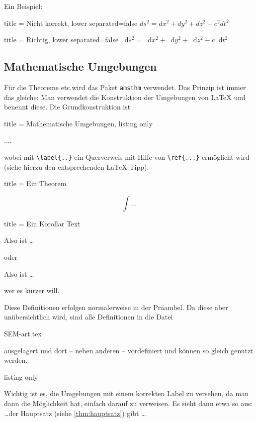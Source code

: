 Ein Beispiel:
\begin{tcblisting}{title = Nicht korrekt, lower separated=false}
$ ds^2=dx^2+dy^2+dz^2-c^2dt^2 $
\end{tcblisting}
\vs 
\begin{tcblisting}{title = Richtig, lower separated=false}
\renewcommand*{\d}[1]{\mathop{}\!\mathrm{d}{#1}}
%
$ \d{s}^{2} = \d{x}^{2} + \d{y}^{2} + \d{z}^{2} - c\d{t}^{2} $
\end{tcblisting}

\subsection{Mathematische Umgebungen}
Für die Theoreme etc.\@ wird das Paket \texttt{amsthm} \cite{amsthm} verwendet.
Das Prinzip ist immer das gleiche: Man verwendet die Konstruktion der Umgebungen von \LaTeX{}{} und benennt diese.
Die Grundkonstruktion ist 
%
\begin{tcblisting}{title = Mathematische Umgebungen, listing only}
\begin{name}\label{key:kuerzel}
 ....
\end{name}
\end{tcblisting}
%
wobei mit \verb!\label{..}! ein Querverweis mit Hilfe von \verb|\ref{...}| ermöglicht wird (siehe hierzu den entsprechenden \LaTeX{}-Tipp).
%
\begin{tcblisting}{title = Ein Theorem}
\begin{theorem}
\[
 \int \ldots
\]
\end{theorem}
\end{tcblisting}
%
\begin{tcblisting}{title = Ein Korollar}
Text
%
\begin{corollary}
  Also ist \ldots
\end{corollary}
%
oder
%
\begin{cor}
  Also ist \ldots
\end{cor}
%
wer es kürzer will.
\end{tcblisting}
%
Diese Definitionen erfolgen normalerweise in der Präambel.
Da diese aber unübersichtlich wird, sind alle Definitionen in die Datei
\begin{tcolorbox}
SEM-art.tex
\end{tcolorbox}
%
ausgelagert und dort -- neben anderen -- vordefiniert und können so gleich genutzt werden.
%
\begin{tcblisting}{listing only}
		\newtheorem{theorem}{Theorem}
		\newtheorem{thm}{Theorem}
		\newtheorem{corollary}[theorem]{Korollar}
		\newtheorem{cor}[theorem]{Korollar}
\end{tcblisting}
%
Wichtig ist es, die Umgebungen mit einem korrekten Label zu versehen, da man dann die Möglichkeit hat, einfach darauf zu verweisen.
Es sieht dann etwa so aus: \ldots der Hauptsatz (siehe \vref{thm:hauptsatz}) gibt \ldots .

